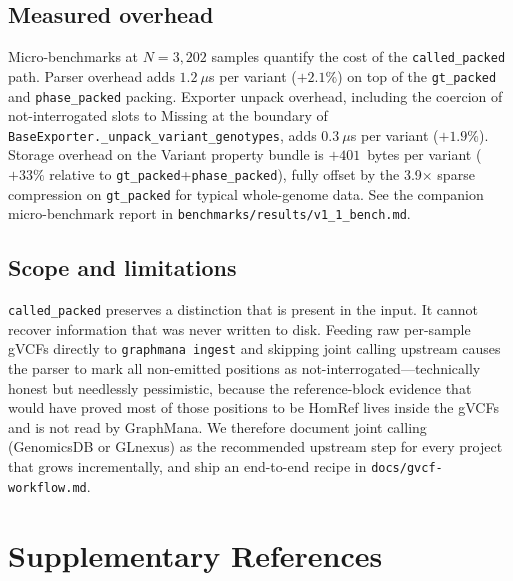 \documentclass[11pt,a4paper]{article}
\begin{document}
\subsection*{Measured overhead}

Micro-benchmarks at $N=3{,}202$ samples quantify the cost of the \texttt{called\_packed} path. Parser overhead adds $1.2~\mu$s per variant ($+2.1\%$) on top of the \texttt{gt\_packed} and \texttt{phase\_packed} packing. Exporter unpack overhead, including the coercion of not-interrogated slots to Missing at the boundary of \texttt{BaseExporter.\_unpack\_variant\_genotypes}, adds $0.3~\mu$s per variant ($+1.9\%$). Storage overhead on the Variant property bundle is $+401$~bytes per variant ($+33\%$ relative to \texttt{gt\_packed}+\texttt{phase\_packed}), fully offset by the 3.9$\times$ sparse compression on \texttt{gt\_packed} for typical whole-genome data. See the companion micro-benchmark report in \texttt{benchmarks/results/v1\_1\_bench.md}.

\subsection*{Scope and limitations}

\texttt{called\_packed} preserves a distinction that is present in the input. It cannot recover information that was never written to disk. Feeding raw per-sample gVCFs directly to \texttt{graphmana ingest} and skipping joint calling upstream causes the parser to mark all non-emitted positions as not-interrogated---technically honest but needlessly pessimistic, because the reference-block evidence that would have proved most of those positions to be HomRef lives inside the gVCFs and is not read by GraphMana. We therefore document joint calling (GenomicsDB or GLnexus) as the recommended upstream step for every project that grows incrementally, and ship an end-to-end recipe in \texttt{docs/gvcf-workflow.md}.

\newpage

\section{Supplementary References}
\end{document}
